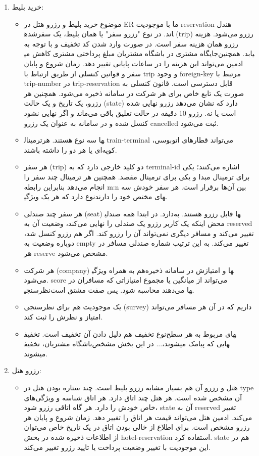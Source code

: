 \begin{enumerate}
\begin{itemize}
	\end{itemize}
	\item خرید بلیط:
	\begin{itemize}
		\item 
		موضوع خرید بلیط و رزرو هتل در ER ما با موجودیت reservation هندل شده‎اند. در نوع "رزرو سفر" یا همان بلیط، یک سفر (trip) رزرو می‌شود. هزینه رزرو همان هزینه سفر است. در صورت وارد شدن کد تخفیف و با توجه به جایگاه مشتری در باشگاه مشتریان مبلغ پرداختی مشتری کاهش می‎یابد. همچنین ادمین می‌تواند این هزینه را در ساعات پایانی تغییر دهد. زمان شروع و پایان سفر و قوانین کنسلی از طریق ارتباط با trip و وجود foreign-key مرتبط با trip-number در trip-reservation قابل دسترسی است. قانون کنسلی به صورت یک تابع خاص برای هر شرکت در سامانه ذخیره می‌شود. همچنین هر رزرو، یک تاریخ و یک حالت (state) دارد که نشان می‌دهد رزرو نهایی شده است یا نه. رزرو 10 دقیقه در حالت تعلیق باقی می‌ماند و اگر نهایی نشود کنسل شده و در سامانه به عنوان یک رزرو cancelled ثبت می‌شود.
		\item 
		ترمینال‎ها سه نوع هستند. هر train-terminal می‌تواند قطارهای اتوبوسی، کوپه‌ای یا هر دو را داشته باشند.
		\item 
		هر سفر (trip) دو کلید خارجی دارد که به terminal-id اشاره می‌کنند؛ یکی برای ترمینال مبدا و یکی برای ترمینال مقصد. همچنین هر ترمینال چند سفر را انجام می‌دهد بنابراین رابطه m:n بین آن‌ها برقرار است. هر سفر خودش سه نوع دارد که هر یک ویژگی‎های مختص خود را دارند.
		\item 
		هر سفر چند صندلی (seat) دارد. در ابتدا همه صندلی‎ها قابل رزرو هستند. به محض اینکه یک کاربر رزرو یک صندلی را نهایی می‌کند، وضعیت آن به reserved تغییر می‌کند و مسافر دیگری نمی‌تواند آن را رزرو کند. اگر هم رزرو کنسل شد، دوباره وضعیت به empty تغییر می‌کند. به این ترتیب شماره صندلی مسافر در هر reserve مشخص می‌شود.
		\item 
		هر شرکت (company) هم به همراه ویژگی‎ها و امتیازش در سامانه ذخیره می‌شود. score می‌تواند از میانگین یا مجموع امتیازاتی که مسافران در نظرسنجی‎ها می‌دهند محاسبه شود. پس صفت مشتق است.
		\item 
		یک موجودیت هم برای نظرسنجی (survey) داریم که در آن هر مسافر می‌تواند امتیاز و نظرش را ثبت کند.
		\item 
		نوع تخفیف هم دلیل دادن آن تخفیف است. تخفیف‎های مربوط به هر سطح باشگاه مشتریان، تخفیف‎هایی که پیامک میشوند،... در این بخش مشخص میشوند.
	\end{itemize}
	\item رزرو هتل:
	\begin{itemize}
		\item 
		هتل و رزرو آن هم بسیار مشابه رزرو بلیط است. چند ستاره بودن هتل در type آن مشخص شده است. هر هتل چند اتاق دارد. هر اتاق شناسه و ویژگی‌های خاص خودش را دارد. هر گاه اتاقی رزرو شود، state آن به reserved تغییر می‌کند. ادمین هتل می‌تواند قیمت هر اتاق را تغییر دهد. زمان شروع و پایان هر رزرو مشخص است. برای اطلاع از خالی بودن اتاق در یک تاریخ خاص می‌توان از اطلاعات ذخیره شده در بخش hotel-reservation استفاده کرد. state هم در این موجودیت با تغییر وضعیت پرداخت یا تایید رزرو تغییر می‌کند.

\end{itemize}
\end{enumerate}
